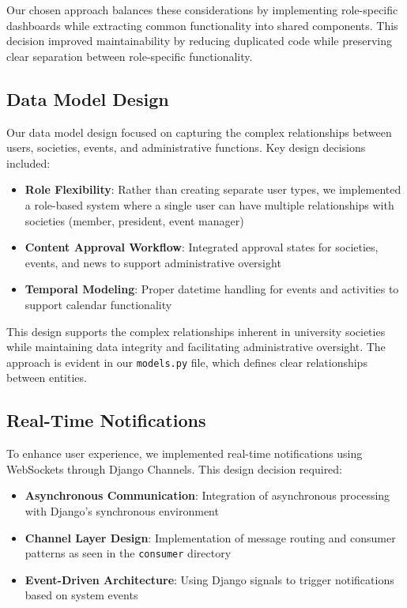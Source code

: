 Our chosen approach balances these considerations by implementing role-specific dashboards while extracting common functionality into shared components. This decision improved maintainability by reducing duplicated code while preserving clear separation between role-specific functionality.

\subsection{Data Model Design}

Our data model design focused on capturing the complex relationships between users, societies, events, and administrative functions. Key design decisions included:

\begin{itemize}
    \item \textbf{Role Flexibility}: Rather than creating separate user types, we implemented a role-based system where a single user can have multiple relationships with societies (member, president, event manager)
    \item \textbf{Content Approval Workflow}: Integrated approval states for societies, events, and news to support administrative oversight
    \item \textbf{Temporal Modeling}: Proper datetime handling for events and activities to support calendar functionality
\end{itemize}

This design supports the complex relationships inherent in university societies while maintaining data integrity and facilitating administrative oversight. The approach is evident in our \texttt{models.py} file, which defines clear relationships between entities.

\subsection{Real-Time Notifications}

To enhance user experience, we implemented real-time notifications using WebSockets through Django Channels. This design decision required:

\begin{itemize}
    \item \textbf{Asynchronous Communication}: Integration of asynchronous processing with Django's synchronous environment
    \item \textbf{Channel Layer Design}: Implementation of message routing and consumer patterns as seen in the \texttt{consumer} directory
    \item \textbf{Event-Driven Architecture}: Using Django signals to trigger notifications based on system events
\end{itemize}

